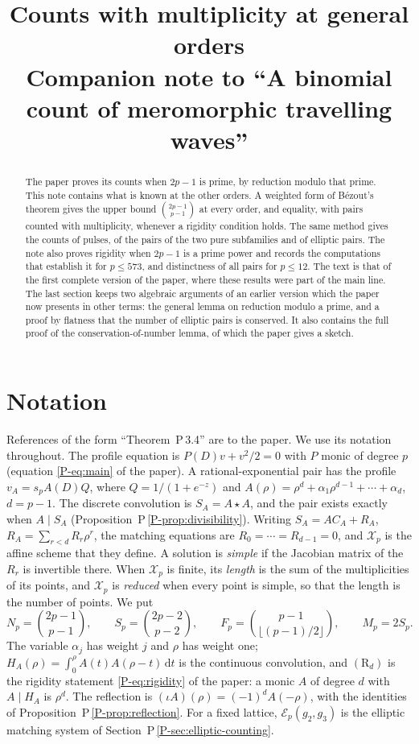 \documentclass[11pt]{article}
\title{Counts with multiplicity at general orders\\[4pt]
\large Companion note to ``A binomial count of meromorphic travelling waves''}
\date{}
\newcommand{\Xp}{\mathcal X_p}
\newcommand{\dd}{\,\mathrm d}
\numberwithin{equation}{section}
\begin{document}
\maketitle

\begin{abstract}
The paper proves its counts when \(2p-1\) is prime, by reduction modulo
that prime. This note contains what is known at the other orders. A
weighted form of B\'ezout's theorem gives the upper bound
\(\binom{2p-1}{p-1}\) at every order, and equality, with pairs counted
with multiplicity, whenever a rigidity condition holds. The same method
gives the counts of pulses, of the pairs of the two pure subfamilies and
of elliptic pairs. The note also proves rigidity when \(2p-1\) is a
prime power and records the computations that establish it for
\(p\le573\), and distinctness of all pairs for \(p\le12\). The text is
that of the first complete version of the paper, where these results
were part of the main line. The last section keeps two algebraic
arguments of an earlier version which the paper now presents in other
terms: the general lemma on reduction modulo a prime, and a proof by
flatness that the number of elliptic pairs is conserved. It also
contains the full proof of the conservation-of-number lemma, of which
the paper gives a sketch.
\end{abstract}

\section{Notation}

References of the form ``Theorem~P\,3.4'' are to the paper. We use its
notation throughout. The profile equation is
\(P(D)v+v^2/2=0\) with \(P\) monic of degree \(p\)
(equation \eqref{P-eq:main} of the paper). A rational-exponential pair
has the profile \(v_A=s_pA(D)Q\), where \(Q=1/(1+e^{-z})\) and
\(A(\rho)=\rho^d+\alpha_1\rho^{d-1}+\cdots+\alpha_d\), \(d=p-1\). The
discrete convolution is \(S_A=A\star A\), and the pair exists exactly
when \(A\mid S_A\) (Proposition~P\,\ref{P-prop:divisibility}). Writing
\(S_A=AC_A+R_A\), \(R_A=\sum_{r<d}R_r\rho^r\), the matching equations are
\(R_0=\cdots=R_{d-1}=0\), and \(\Xp\) is the affine scheme that they
define. A solution is \emph{simple} if the Jacobian matrix of the
\(R_r\) is invertible there. When \(\Xp\) is finite, its \emph{length}
is the sum of the multiplicities of its points, and \(\Xp\) is
\emph{reduced} when every point is simple, so that the length is the
number of points. We put
\[
 N_p=\binom{2p-1}{p-1},\qquad S_p=\binom{2p-2}{p-2},\qquad
 F_p=\binom{p-1}{\lfloor(p-1)/2\rfloor},\qquad M_p=2S_p .
\]
The variable \(\alpha_j\) has weight \(j\) and \(\rho\) has weight one;
\(H_A(\rho)=\int_0^\rho A(t)A(\rho-t)\dd t\) is the continuous
convolution, and \((\mathrm R_d)\) is the rigidity statement
\eqref{P-eq:rigidity} of the paper: a monic \(A\) of degree \(d\) with
\(A\mid H_A\) is \(\rho^d\). The reflection is
\((\iota A)(\rho)=(-1)^dA(-\rho)\), with the identities of
Proposition~P\,\ref{P-prop:reflection}. For a fixed lattice,
\(\mathcal E_p(g_2,g_3)\) is the elliptic matching system of
Section~P\,\ref{P-sec:elliptic-counting}.
\end{document}
